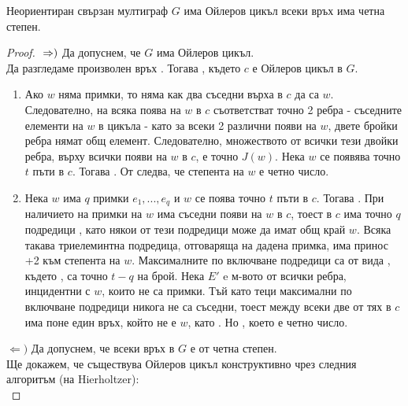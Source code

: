 \begin{theorem}
    Неориентиран свързан мултиграф \(G\) има Ойлеров цикъл \totw всеки връх има четна степен.
\end{theorem}

\begin{proof}
    \(\newline\Rightarrow)\) Да допуснем, че \(G\) има Ойлеров цикъл. \\
    Да разгледаме произволен връх . Тогава , където \(c\) е 
    Ойлеров цикъл в \(G\).
    \begin{enumerate}
        \item Ако \(w\) няма примки, то няма как два съседни върха в \(c\) да са \(w\). Следователно, на 
        всяка поява на \(w\) в \(c\) съответстват точно 2 ребра - съседните елементи на \(w\) в цикъла - 
        като за всеки 2 различни появи на \(w\), двете бройки ребра нямат общ елемент. Следователно, 
        множеството от всички тези двойки ребра, върху всички появи на \(w\) в \(c\), е точно \(J(w)\). 
        Нека \(w\) се появява точно \(t\) пъти в \(c\). Тогава . От  
        следва, че степента на \(w\) е четно число.
        \item Нека \(w\) има \(q\) примки \(e_1, ..., e_q\) и \(w\) се поява точно \(t\) пъти в \(c\). 
        Тогава . При наличието на примки на \(w\) има съседни появи на \(w\) в \(c\), тоест 
        в \(c\) има точно \(q\) подредици , като някои от тези подредици може 
        да имат общ край \(w\). Всяка такава триелеминтна подредица, отговаряща на дадена примка, има принос 
        +2 към степента на \(w\). Максималните по включване подредици са от вида , 
        където , са точно \(t - q\) на брой. Нека \(E'\) e 
        м-вото от всички ребра, инцидентни с \(w\), които не са примки. Тъй като теци максимални по 
        включване подредици никога не са съседни, тоест между всеки две от тях в \(c\) има поне един връх, който 
        не е \(w\), като . Но , което 
        е четно число.
    \end{enumerate}
    \(\Leftarrow)\) Да допуснем, че всеки връх в \(G\) е от четна степен. \\
    Ще докажем, че съществува Ойлеров цикъл конструктивно чрез следния алгоритъм (на Hierholtzer): \\

\end{proof}
